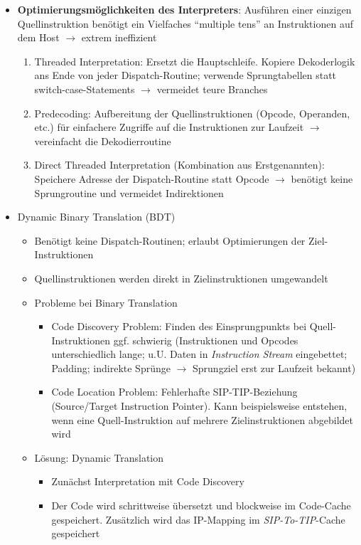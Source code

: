 \begin{itemize}
	\item \textbf{Optimierungsmöglichkeiten des Interpreters}: Ausführen einer einzigen Quellinstruktion benötigt ein Vielfaches "`multiple tens"' an Instruktionen auf dem Host \(\rightarrow\) extrem ineffizient
	\begin{enumerate} %
		\item Threaded Interpretation: Ersetzt die Hauptschleife. Kopiere Dekoderlogik ans Ende von jeder Dispatch-Routine; verwende Sprungtabellen statt switch-case-Statements \(\rightarrow\) vermeidet teure Branches
		\item Predecoding: Aufbereitung der Quellinstruktionen (Opcode, Operanden, etc.) für einfachere Zugriffe auf die Instruktionen zur Laufzeit \(\rightarrow\) vereinfacht die Dekodierroutine
		\item Direct Threaded Interpretation (Kombination aus Erstgenannten): Speichere Adresse der Dispatch-Routine statt Opcode \(\rightarrow\) benötigt keine Sprungroutine und vermeidet Indirektionen 
	\end{enumerate}
	\item Dynamic Binary Translation (BDT)
	\begin{itemize}
		\item Benötigt keine Dispatch-Routinen; erlaubt Optimierungen der Ziel-Instruktionen
		\item Quellinstruktionen werden direkt in Zielinstruktionen umgewandelt
		\item Probleme bei Binary Translation
		\begin{itemize}
			\item Code Discovery Problem: Finden des Einsprungpunkts bei Quell-Instruktionen ggf. schwierig (Instruktionen und Opcodes unterschiedlich lange; u.U. Daten in \textit{Instruction Stream} eingebettet; Padding; indirekte Sprünge \(\rightarrow\) Sprungziel erst zur Laufzeit bekannt)
			\item Code Location Problem: Fehlerhafte SIP-TIP-Beziehung (Source/Target Instruction Pointer). Kann beispielsweise entstehen, wenn eine Quell-Instruktion auf mehrere Zielinstruktionen abgebildet wird
		\end{itemize}
		\item Lösung: Dynamic Translation
		\begin{itemize}
			\item Zunächst Interpretation mit Code Discovery
			\item Der Code wird schrittweise übersetzt und blockweise im Code-Cache gespeichert. Zusätzlich wird das IP-Mapping im \textit{SIP-To-TIP}-Cache gespeichert

\end{itemize}
\end{itemize}
\end{itemize}
